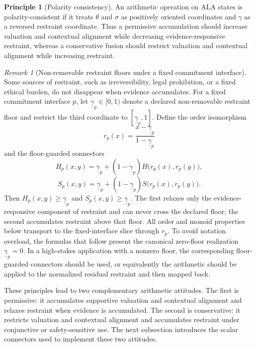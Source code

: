 \documentclass[reqno,final]{amsart}
\theoremstyle{definition}
\newtheorem{principle}{Principle}
\theoremstyle{plain}
\theoremstyle{remark}
\newtheorem{remark}{Remark}
\begin{document}
\begin{principle}[Polarity consistency]
\label{principle:polarity-consistency}
An arithmetic operation on ALA states is polarity-consistent if it treats \(\theta\) and \(\sigma\) as positively oriented coordinates and \(\gamma\) as a reversed restraint coordinate. Thus a permissive accumulation should increase valuation and contextual alignment while decreasing evidence-responsive restraint, whereas a conservative fusion should restrict valuation and contextual alignment while increasing restraint.
\end{principle}

\begin{remark}[Non-removable restraint floors under a fixed commitment interface]
\label{rem:restraint-floor}
Some sources of restraint, such as irreversibility, legal prohibition, or a fixed ethical burden, do not disappear when evidence accumulates. For a fixed commitment interface \(p\), let \(\underline{\gamma}_p\in[0,1)\) denote a declared non-removable restraint floor and restrict the third coordinate to \([\underline{\gamma}_p,1]\). Define the order isomorphism
\[
r_p(x)=\frac{x-\underline{\gamma}_p}{1-\underline{\gamma}_p}
\]
and the floor-guarded connectors
\[
H_p(x,y)
=
\underline{\gamma}_p+
(1-\underline{\gamma}_p)
H\bigl(r_p(x),r_p(y)\bigr),
\]
\[
S_p(x,y)
=
\underline{\gamma}_p+
(1-\underline{\gamma}_p)
S\bigl(r_p(x),r_p(y)\bigr).
\]
Then \(H_p(x,y)\geq\underline{\gamma}_p\) and \(S_p(x,y)\geq\underline{\gamma}_p\). The first relaxes only the evidence-responsive component of restraint and can never cross the declared floor; the second accumulates restraint above that floor. All order and monoid properties below transport to the fixed-interface slice through \(r_p\). To avoid notation overload, the formulas that follow present the canonical zero-floor realization \(\underline{\gamma}_p=0\). In a high-stakes application with a nonzero floor, the corresponding floor-guarded connectors should be used, or equivalently the arithmetic should be applied to the normalized residual restraint and then mapped back.
\end{remark}

These principles lead to two complementary arithmetic attitudes. The first is permissive: it accumulates supportive valuation and contextual alignment and relaxes restraint when evidence is accumulated. The second is conservative: it restricts valuation and contextual alignment and accumulates restraint under conjunctive or safety-sensitive use. The next subsection introduces the scalar connectors used to implement these two attitudes.
\end{document}
